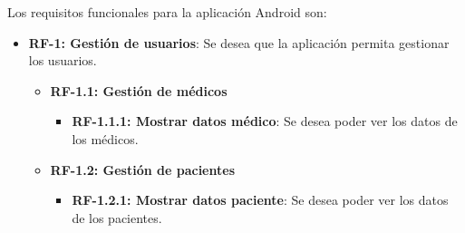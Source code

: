 Los requisitos funcionales para la aplicación Android son:
\begin{itemize}
    \item \textbf{RF-1: Gestión de usuarios}: Se desea que la aplicación permita gestionar los usuarios.
        \begin{itemize}
            \item \textbf{RF-1.1: Gestión de médicos}
            \begin{itemize}
                \item \textbf{RF-1.1.1: Mostrar datos médico}: Se desea poder ver los datos de los médicos.
            \end{itemize}
            \item \textbf{RF-1.2: Gestión de pacientes}
            \begin{itemize}
                \item \textbf{RF-1.2.1: Mostrar datos paciente}: Se desea poder ver los datos de los pacientes.
                
            \end{itemize}
            \end{itemize}
 

\end{itemize}
